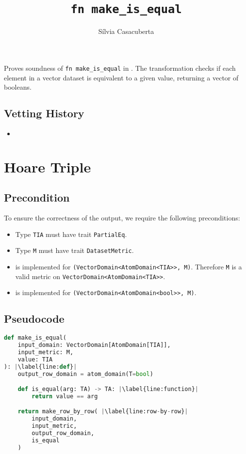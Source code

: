 \documentclass{article}
\title{\texttt{fn make\_is\_equal}}
\author{S\'ilvia Casacuberta}
\date{}
\begin{document}
\maketitle

\contrib
Proves soundness of \texttt{fn make\_is\_equal} in .
The transformation checks if each element in a vector dataset is equivalent to a given value,
returning a vector of booleans.

\subsection*{Vetting History}
\begin{itemize}
    \item {}
\end{itemize}

\section{Hoare Triple}
\subsection*{Precondition}
To ensure the correctness of the output, we require the following preconditions:

\begin{itemize}
    \item Type \texttt{TIA} must have trait \texttt{PartialEq}.
    \item Type \texttt{M} must have trait \texttt{DatasetMetric}.
    \item {} is implemented for \texttt{(VectorDomain<AtomDomain<TIA>{}>, M)}. Therefore \texttt{M} is a valid metric on \texttt{VectorDomain<AtomDomain<TIA>{}>}.
    \item {} is implemented for \texttt{(VectorDomain<AtomDomain<bool>{}>, M)}.
\end{itemize}

\subsection*{Pseudocode}
\begin{lstlisting}[language=Python, escapechar=|] 
def make_is_equal(
    input_domain: VectorDomain[AtomDomain[TIA]], 
    input_metric: M, 
    value: TIA
): |\label{line:def}|
    output_row_domain = atom_domain(T=bool)

    def is_equal(arg: TA) -> TA: |\label{line:function}|
        return value == arg

    return make_row_by_row( |\label{line:row-by-row}|
        input_domain, 
        input_metric, 
        output_row_domain, 
        is_equal
    )
\end{lstlisting}
\end{document}
